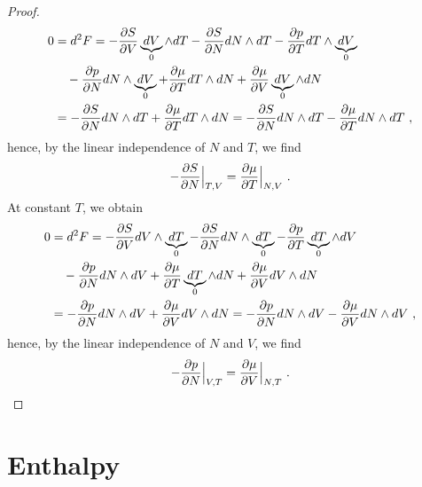 \begin{proof}
\begin{equation*}
\begin{aligned}
            0 & = d^2 F = - \frac{\partial S}{\partial V} \underbrace{dV}_0 \wedge dT - \frac{\partial S}{\partial N} dN \wedge dT - \frac{\partial p}{\partial T} dT \wedge \underbrace{dV}_0 \\ & \quad - \frac{\partial p}{\partial N} dN \wedge \underbrace{dV}_0 + \frac{\partial\mu}{\partial T} dT \wedge dN + \frac{\partial\mu}{\partial V} \underbrace{dV}_0 \wedge dN \\ & = - \frac{\partial S}{\partial N} dN \wedge dT + \frac{\partial\mu}{\partial T} dT \wedge dN = - \frac{\partial S}{\partial N} dN \wedge dT - \frac{\partial\mu}{\partial T} dN \wedge dT~,
        \end{aligned}
        \end{equation*}
        hence, by the linear independence of $N$ and $T$, we find
        \begin{equation*}
            - \frac{\partial S}{\partial N} \Big \vert_{T,V} = \frac{\partial\mu}{\partial T} \Big \vert_{N, V} ~.
        \end{equation*}
        At constant $T$, we obtain
        \begin{equation*}
        \begin{aligned}
            0 & = d^2 F = - \frac{\partial S}{\partial V} dV \wedge \underbrace{dT}_0 - \frac{\partial S}{\partial N} dN \wedge \underbrace{dT}_0 - \frac{\partial p}{\partial T} \underbrace{dT}_0 \wedge dV \\ & \quad - \frac{\partial p}{\partial N} dN \wedge dV + \frac{\partial\mu}{\partial T} \underbrace{dT}_0 \wedge dN + \frac{\partial\mu}{\partial V} dV \wedge dN \\ & = - \frac{\partial p}{\partial N} dN \wedge dV + \frac{\partial\mu}{\partial V} dV \wedge dN =- \frac{\partial p}{\partial N} dN \wedge dV - \frac{\partial\mu}{\partial V} dN \wedge dV ~,
        \end{aligned}
        \end{equation*}
        hence, by the linear independence of $N$ and $V$, we find
        \begin{equation*}
            - \frac{\partial p}{\partial N} \Big \vert_{V,T} = \frac{\partial\mu}{\partial V} \Big \vert_{N, T} ~.
        \end{equation*}
    \end{proof}

\section{Enthalpy} 

